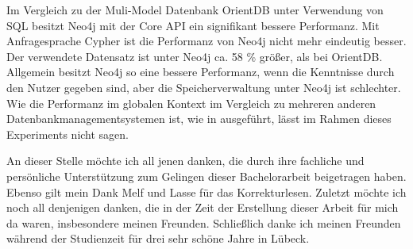 Im Vergleich zu der Muli-Model Datenbank OrientDB unter Verwendung von SQL besitzt Neo4j mit der Core API ein signifikant bessere Performanz. Mit  Anfragesprache Cypher ist die Performanz von Neo4j nicht mehr eindeutig besser. Der verwendete Datensatz ist unter Neo4j ca. 58 \% größer, als bei OrientDB. Allgemein besitzt Neo4j so eine bessere Performanz, wenn die Kenntnisse durch den Nutzer gegeben sind, aber die Speicherverwaltung unter Neo4j ist schlechter. Wie die Performanz im globalen Kontext im Vergleich zu mehreren anderen Datenbankmanagementsystemen ist, wie in \parencite{jouili2013empirical} ausgeführt,  lässt im Rahmen dieses Experiments nicht sagen. 

\begin{acknowledgements}
	An dieser Stelle möchte ich all jenen danken, die durch ihre fachliche und persönliche Unterstützung zum Gelingen dieser Bachelorarbeit beigetragen haben. \newline \newline
	Ebenso gilt mein Dank Melf und Lasse für das Korrekturlesen. Zuletzt möchte ich noch all denjenigen danken, die in der Zeit der Erstellung dieser Arbeit für mich da waren, insbesondere meinen Freunden. \newline \newline
	Schließlich danke ich meinen Freunden während der Studienzeit für drei sehr schöne Jahre in Lübeck.
\end{acknowledgements}
